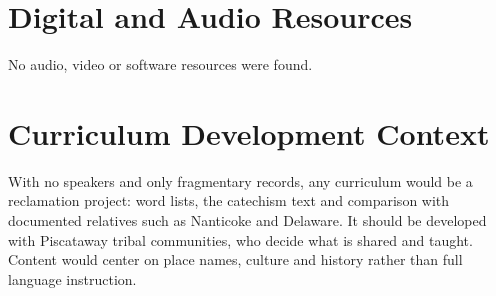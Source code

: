 \documentclass[12pt]{article}
\begin{document}
\section{Digital and Audio Resources}
No audio, video or software resources were found.

\section{Curriculum Development Context}
With no speakers and only fragmentary records, any curriculum would be a reclamation project: word lists, the catechism text and comparison with documented relatives such as Nanticoke and Delaware. It should be developed with Piscataway tribal communities, who decide what is shared and taught. Content would center on place names, culture and history rather than full language instruction.
\end{document}
